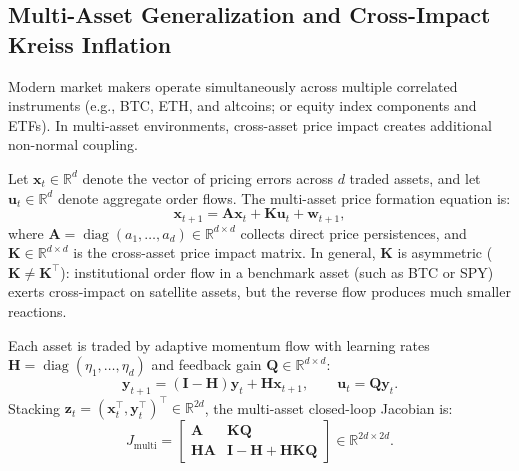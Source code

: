 \documentclass[12pt]{article}
\theoremstyle{definition}
\theoremstyle{remark}
\newcommand{\R}{\mathbb{R}}
\newcommand{\diag}{\operatorname{diag}}
\begin{document}
\subsection{Multi-Asset Generalization and Cross-Impact Kreiss Inflation}
Modern market makers operate simultaneously across multiple correlated instruments (e.g., BTC, ETH, and altcoins; or equity index components and ETFs). In multi-asset environments, cross-asset price impact creates additional non-normal coupling.

Let $\mathbf{x}_t \in \R^d$ denote the vector of pricing errors across $d$ traded assets, and let $\mathbf{u}_t \in \R^d$ denote aggregate order flows. The multi-asset price formation equation is:
\begin{equation}
\mathbf{x}_{t+1} = \mathbf{A} \mathbf{x}_t + \mathbf{K} \mathbf{u}_t + \mathbf{w}_{t+1},
\label{eq:multi_price}
\end{equation}
where $\mathbf{A} = \diag(a_1, \dots, a_d) \in \R^{d \times d}$ collects direct price persistences, and $\mathbf{K} \in \R^{d \times d}$ is the cross-asset price impact matrix. In general, $\mathbf{K}$ is asymmetric ($\mathbf{K} \neq \mathbf{K}^\top$): institutional order flow in a benchmark asset (such as BTC or SPY) exerts cross-impact on satellite assets, but the reverse flow produces much smaller reactions.

Each asset is traded by adaptive momentum flow with learning rates $\mathbf{H} = \diag(\eta_1, \dots, \eta_d)$ and feedback gain $\mathbf{Q} \in \R^{d \times d}$:
\begin{equation}
\mathbf{y}_{t+1} = (\mathbf{I} - \mathbf{H}) \mathbf{y}_t + \mathbf{H} \mathbf{x}_{t+1}, \qquad \mathbf{u}_t = \mathbf{Q} \mathbf{y}_t.
\end{equation}
Stacking $\mathbf{z}_t = (\mathbf{x}_t^\top, \mathbf{y}_t^\top)^\top \in \R^{2d}$, the multi-asset closed-loop Jacobian is:
\begin{equation}
J_{\text{multi}} = \begin{bmatrix}
\mathbf{A} & \mathbf{K} \mathbf{Q} \\
\mathbf{H} \mathbf{A} & \mathbf{I} - \mathbf{H} + \mathbf{H} \mathbf{K} \mathbf{Q}
\end{bmatrix} \in \R^{2d \times 2d}.
\label{eq:multi_jacobian}
\end{equation}
\end{document}
